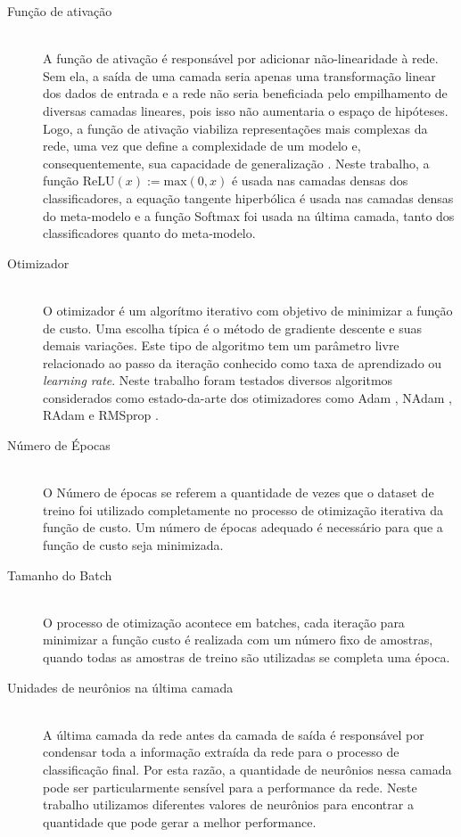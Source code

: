 \begin{description}
  \item[Função de ativação] \hfill \\
        A função de ativação é responsável por adicionar não-linearidade à rede. Sem ela, a saída de uma camada seria apenas uma transformação linear dos dados de entrada e a rede não seria beneficiada pelo empilhamento de diversas camadas lineares, pois isso não aumentaria o espaço de hipóteses. Logo, a função de ativação viabiliza representações mais complexas da rede, uma vez que define a complexidade de um modelo e, consequentemente, sua capacidade de generalização \citep{CholletBook}. Neste trabalho, a função $\textrm{ReLU}(x) := \textrm{max}(0, x)$ é usada nas camadas densas dos classificadores, a equação tangente hiperbólica é usada nas camadas densas do meta-modelo e a função Softmax \citep{Bridle1990} foi usada na última camada, tanto dos classificadores quanto do meta-modelo.

  \item[Otimizador] \hfill \\
        O otimizador é um algorítmo iterativo com objetivo de minimizar a função de custo. Uma escolha típica é o método de gradiente descente e suas demais variações. Este tipo de algoritmo tem um parâmetro livre relacionado ao passo da iteração conhecido como taxa de aprendizado ou \textit{learning rate}. Neste trabalho foram testados diversos algoritmos considerados como estado-da-arte dos otimizadores como Adam \citep{Adam}, NAdam \citep{NAdam}, RAdam \citep{RAdam} e RMSprop \citep{RMSprop}.

  \item[Número de Épocas] \hfill \\
        O Número de épocas se referem a quantidade de vezes que o dataset de treino foi utilizado completamente no processo de otimização iterativa da função de custo. Um número de épocas adequado é necessário para que a função de custo seja minimizada.

  \item[Tamanho do Batch] \hfill \\
        O processo de otimização acontece em batches, cada iteração para minimizar a função custo é realizada com um número fixo de amostras, quando todas as amostras de treino são utilizadas se completa uma época.

  \item[Unidades de neurônios na última camada]
        \hfill \\
        A última camada da rede antes da camada de saída é responsável por condensar toda a informação extraída da rede para o processo de classificação final. Por esta razão, a quantidade de neurônios nessa camada pode ser particularmente sensível para a performance da rede. Neste trabalho utilizamos diferentes valores de neurônios para encontrar a quantidade que pode gerar a melhor performance.


\end{description}
